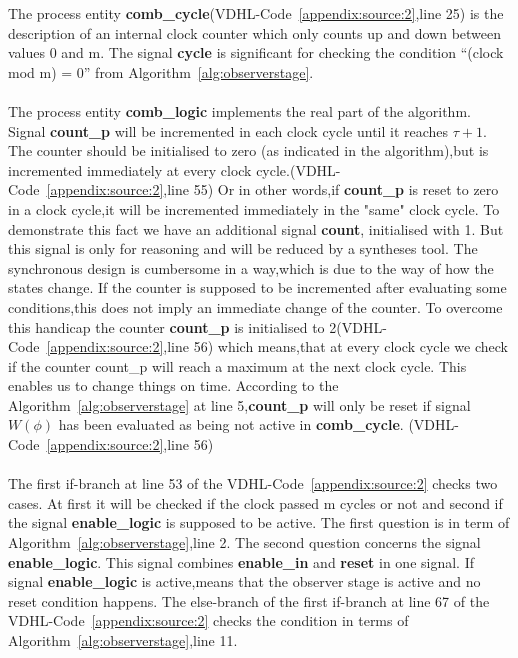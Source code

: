 \newline \newline
The process entity \textbf{comb\_cycle}(VDHL-Code~\ref{appendix:source:2},line 25) is the description of an internal clock counter which only counts up and down between values 0 and m.
The signal \textbf{cycle} is significant for checking the condition ``(clock mod m) = 0'' from Algorithm~\ref{alg:observerstage}.\\ \\
The process entity \textbf{comb\_logic} implements the real part of the algorithm.
Signal \textbf{count\_p} will be incremented in each clock cycle until it reaches $\tau+1$.
The counter should be initialised to zero (as indicated in the algorithm),but is incremented immediately at every clock cycle.(VDHL-Code~\ref{appendix:source:2},line 55)
Or in other words,if \textbf{count\_p} is reset to zero in a clock cycle,it will be incremented immediately in the "same" clock cycle. 
To demonstrate this fact we have an additional signal \textbf{count}, initialised with 1. 
But this signal is only for reasoning and will be reduced by a syntheses tool.  
The synchronous design is cumbersome in a way,which is due to the way of how the states change.
If the counter is supposed to be incremented after evaluating some conditions,this does not imply an immediate change of the counter.
To overcome this handicap the counter  \textbf{count\_p} is initialised to 2(VDHL-Code~\ref{appendix:source:2},line 56) which means,that 
at every clock cycle we check if the counter count\_p will reach a maximum at the next clock cycle. This enables us to change things on time. 
According to the Algorithm~\ref{alg:observerstage} at line 5,\textbf{count\_p} will only be reset if signal $W(\phi)$ has been evaluated as being not active in \textbf{comb\_cycle}. 
(VDHL-Code~\ref{appendix:source:2},line 56) \\\\
The first if-branch at line 53 of the VDHL-Code~\ref{appendix:source:2} checks two cases.
At first it will be checked if the clock passed m cycles or not and second if the signal \textbf{enable\_logic} is supposed to be active.
The first question is in term of Algorithm~\ref{alg:observerstage},line 2.
The second question concerns the signal \textbf{enable\_logic}. This signal combines \textbf{enable\_in} and \textbf{reset} in one signal. 
If signal \textbf{enable\_logic} is active,means that the observer stage is active and no reset condition happens.
The else-branch of the first if-branch at line 67  of the VDHL-Code~\ref{appendix:source:2} checks the condition in terms of  Algorithm~\ref{alg:observerstage},line 11.

